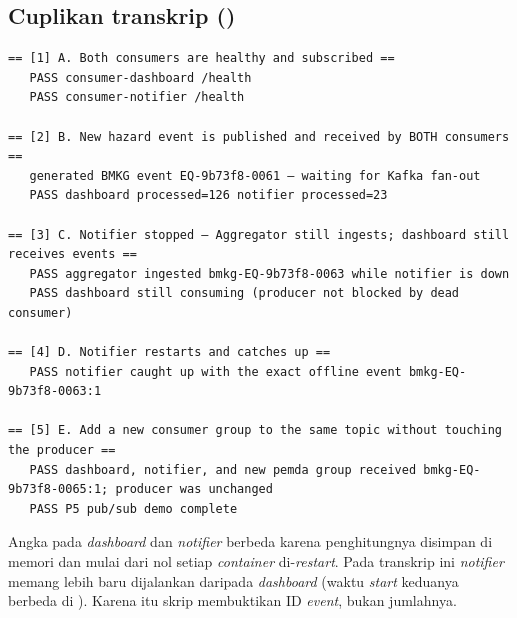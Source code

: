 \subsection*{Cuplikan transkrip ()}
\begin{lstlisting}
== [1] A. Both consumers are healthy and subscribed ==
   PASS consumer-dashboard /health
   PASS consumer-notifier /health

== [2] B. New hazard event is published and received by BOTH consumers ==
   generated BMKG event EQ-9b73f8-0061 — waiting for Kafka fan-out
   PASS dashboard processed=126 notifier processed=23

== [3] C. Notifier stopped — Aggregator still ingests; dashboard still receives events ==
   PASS aggregator ingested bmkg-EQ-9b73f8-0063 while notifier is down
   PASS dashboard still consuming (producer not blocked by dead consumer)

== [4] D. Notifier restarts and catches up ==
   PASS notifier caught up with the exact offline event bmkg-EQ-9b73f8-0063:1

== [5] E. Add a new consumer group to the same topic without touching the producer ==
   PASS dashboard, notifier, and new pemda group received bmkg-EQ-9b73f8-0065:1; producer was unchanged
   PASS P5 pub/sub demo complete
\end{lstlisting}

Angka  pada \emph{dashboard} dan \emph{notifier} berbeda karena penghitungnya disimpan di memori dan mulai dari nol
setiap \emph{container} di-\emph{restart}. Pada transkrip ini \emph{notifier} memang lebih baru dijalankan daripada \emph{dashboard} (waktu
\emph{start} keduanya berbeda di ). Karena itu skrip membuktikan ID \emph{event}, bukan jumlahnya.

